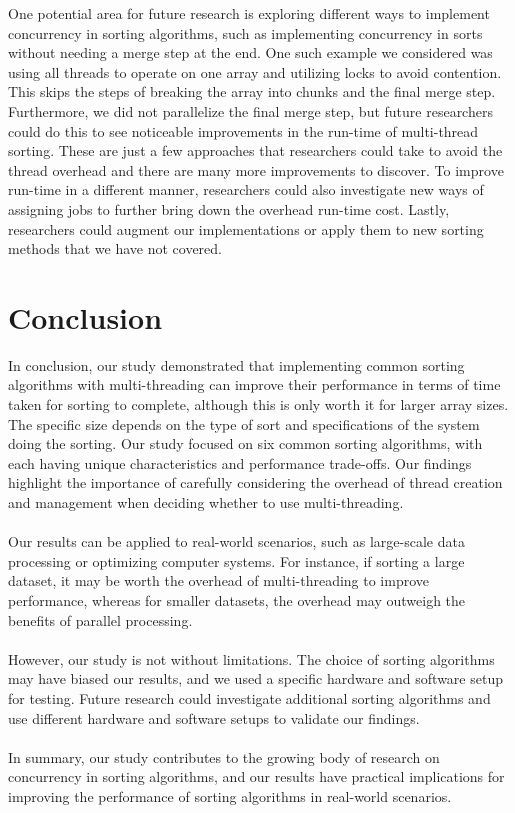 \documentclass[conference]{IEEEtran}
\begin{document}
One potential area for future research is exploring different ways to implement concurrency in sorting algorithms, such as implementing concurrency in sorts without needing a merge step at the end. One such example we considered was using all threads to operate on one array and utilizing locks to avoid contention. This skips the steps of breaking the array into chunks and the final merge step. Furthermore, we did not parallelize the final merge step, but future researchers could do this to see noticeable improvements in the run-time of multi-thread sorting. These are just a few approaches that researchers could take to avoid the thread overhead and there are many more improvements to discover. To improve run-time in a different manner, researchers could also investigate new ways of assigning jobs to further bring down the overhead run-time cost. Lastly, researchers could augment our implementations or apply them to new sorting methods that we have not covered.

\section{Conclusion}
In conclusion, our study demonstrated that implementing common sorting algorithms with multi-threading can improve their performance in terms of time taken for sorting to complete, although this is only worth it for larger array sizes. The specific size depends on the type of sort and specifications of the system doing the sorting. Our study focused on six common sorting algorithms, with each having unique characteristics and performance trade-offs. Our findings highlight the importance of carefully considering the overhead of thread creation and management when deciding whether to use multi-threading.
\\\\
Our results can be applied to real-world scenarios, such as large-scale data processing or optimizing computer systems. For instance, if sorting a large dataset, it may be worth the overhead of multi-threading to improve performance, whereas for smaller datasets, the overhead may outweigh the benefits of parallel processing.
\\\\
However, our study is not without limitations. The choice of sorting algorithms may have biased our results, and we used a specific hardware and software setup for testing. Future research could investigate additional sorting algorithms and use different hardware and software setups to validate our findings.
\\\\
In summary, our study contributes to the growing body of research on concurrency in sorting algorithms, and our results have practical implications for improving the performance of sorting algorithms in real-world scenarios.
\end{document}
